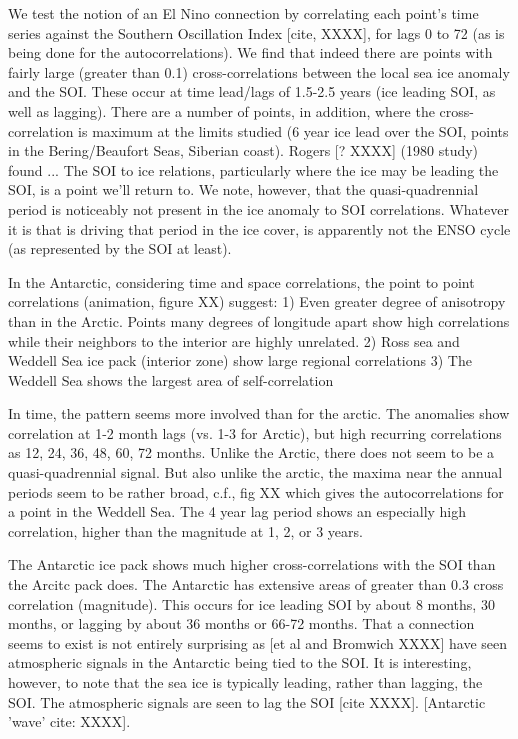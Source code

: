   We test the notion of an El Nino connection by correlating each point's
time series against the Southern Oscillation Index [cite, XXXX], for lags
0 to 72 (as is being done for the autocorrelations).  We find that indeed
there are points with fairly large (greater than 0.1) cross-correlations
between the local sea ice anomaly and the SOI.  These occur at time lead/lags
of 1.5-2.5 years (ice leading SOI, as well as lagging).  There are a number
of points, in addition, where the cross-correlation is maximum at the limits
studied (6 year ice lead over the SOI, points in the Bering/Beaufort Seas,
Siberian coast).  
Rogers [? XXXX] (1980 study) found ...
The SOI to ice relations, particularly where the ice may be leading the SOI,
is a point we'll return to.  We note, however, that the quasi-quadrennial
period is noticeably not present in the ice anomaly to SOI correlations.
Whatever it is that is driving that period in the ice cover, is apparently
not the ENSO cycle (as represented by the SOI at least).

  In the Antarctic, considering time and space correlations, the point to
point correlations (animation, figure XX) suggest:
  1) Even greater degree of anisotropy than in the Arctic.  Points many degrees
of longitude apart show high correlations while their neighbors to the
interior are highly unrelated.
  2) Ross sea and Weddell Sea ice pack (interior zone) show large regional
correlations
  3) The Weddell Sea shows the largest area of self-correlation
 
  In time, the pattern seems more involved than for the arctic.  The anomalies
show correlation at 1-2 month lags (vs. 1-3 for Arctic), but high recurring
correlations as 12, 24, 36, 48, 60, 72 months.  Unlike the Arctic, there
does not seem to be a quasi-quadrennial signal.  But also unlike the arctic,
the maxima near the annual periods seem to be rather broad, c.f., fig XX which
gives the autocorrelations for a point in the Weddell Sea.  The 4 year lag
period shows an especially high correlation, higher than the magnitude at 1,
2, or 3 years. 

  The Antarctic ice pack shows much higher cross-correlations with the SOI
than the Arcitc pack does.  The Antarctic has extensive areas of greater
than 0.3 cross correlation (magnitude).  This occurs for ice leading SOI
by about 8 months, 30 months, or lagging by about 36 months or 66-72 months.
That a connection seems to exist is not entirely surprising as [et al and
Bromwich XXXX] have seen atmospheric signals in the Antarctic being tied
to the SOI.  It is interesting, however, to note that the sea ice is typically
leading, rather than lagging, the SOI.  The atmospheric signals are seen
to lag the SOI [cite XXXX].
[Antarctic 'wave' cite: XXXX].

